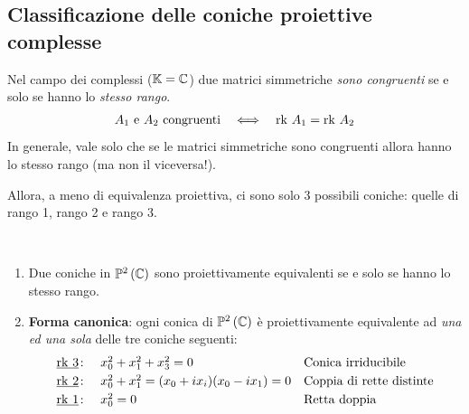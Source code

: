 \subsection{Classificazione delle coniche proiettive complesse}
\begin{remember}
Nel campo dei complessi ($\mathbb{K}=\mathbb{C}$) due matrici simmetriche \textit{sono congruenti} se e solo se hanno lo \textit{stesso rango}.
\begin{equation*}
	\begin{array}{ccc}
		A_1\text{ e }A_2\text{ congruenti}& \iff & \mathrm{rk}\  A_1=\mathrm{rk}\  A_2
	\end{array}
\end{equation*}
In generale, vale solo che se le matrici simmetriche sono congruenti allora hanno lo stesso rango (ma non il viceversa!).
\end{remember}
Allora, a meno di equivalenza proiettiva, ci sono solo 3 possibili coniche: quelle di rango 1, rango 2 e rango 3.
\begin{theorema}~{}\\
\begin{enumerate}
\item	Due coniche in $\proj[2]{\complexset}$ sono proiettivamente equivalenti se e solo se hanno lo stesso rango.
\item	\textbf{Forma canonica}: ogni conica di $\proj[2]{\complexset}$ è proiettivamente equivalente ad \textit{una ed una sola} delle tre coniche seguenti:\\
\begin{equation*}
		\begin{array}{cll}
		\underline{\mathrm{rk}\  3}\colon & x_0^2+x_1^2+x_3^2=0 &	\text{Conica irriducibile}\\[1mm]
		\underline{\mathrm{rk}\  2} \colon & x_0^2+x_1^2=(x_0+ix_i)(x_0-ix_1)=0 & \text{Coppia di rette distinte}\\[1mm]
		\underline{\mathrm{rk}\  1} \colon & x_0^2=0 & \text{Retta doppia}
	\end{array}
\end{equation*}
\end{enumerate}
\vspace{-3mm}
\end{theorema}


